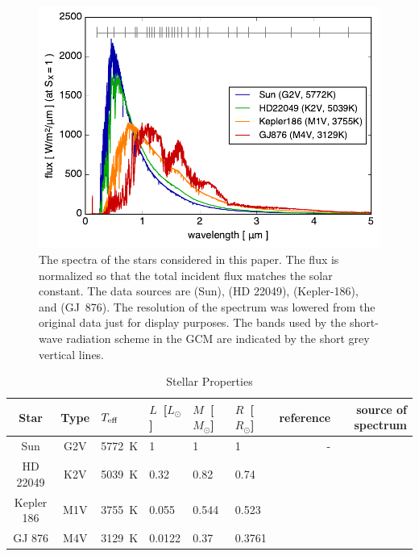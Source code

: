 \documentclass[11pt,numberedappendix,twocolappendix,]{emulateapj}
\begin{document}
\begin{figure}[!bh]
    \begin{center}
    \includegraphics[width=\hsize]{fig/star_spectra.pdf}
    \end{center}
\caption{The spectra of the stars considered in this paper. The flux is normalized so that the total incident flux matches the solar constant. The data sources are \citet{Kurucz1995} (Sun), \citet{Segura2003} (HD 22049), \citet{Allard2012} (Kepler-186), and \citet{Domagal-Goldman2014} (GJ~876). The resolution of the spectrum was lowered from the original data just for display purposes. The bands used by the short-wave radiation scheme in the GCM are indicated by the short grey vertical lines.}
\label{fig:star_spectra}
\end{figure}



\begin{table}[btp]
\caption{Stellar Properties}
\begin{center}
\begin{tabular}{ccllllrr} \hline \hline
%
Star & Type & $T_{\rm eff}$ & $L$~[$L_{\odot}$] & $M$~[$M_{\odot}$] & $R$~[$R_{\odot}$] & reference & source of spectrum \\ \hline
%
Sun & G2V & 5772~K & 1 & 1 & 1 & - & \citet{Kurucz1995} \\ 
%
HD 22049 & K2V & 5039~K & 0.32 & 0.82 & 0.74 & \citet{Baines2012} & \citet{Segura2003} \\
%
Kepler 186 & M1V & 3755~K & 0.055 & 0.544 & 0.523 & \citet{Torres2015} & \citet{Allard2012} \\
%
GJ 876 & M4V & 3129~K & 0.0122 & 0.37 & 0.3761 & \citet{vonBraun2014} & \citet{Domagal-Goldman2014} \\ \hline
\end{tabular}
\end{center}
\label{tbl:stellar_properties}
\end{table}%
\end{document}
